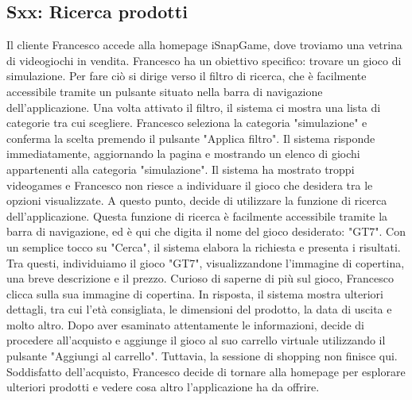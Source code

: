 \documentclass[12pt, a4paper, oneside]{book}
\begin{document}
    \subsection*{Sxx: Ricerca prodotti}

    Il cliente Francesco accede alla homepage iSnapGame, dove troviamo una vetrina di videogiochi in vendita.
    Francesco ha un obiettivo specifico: trovare un gioco di simulazione. Per fare ciò si dirige verso il filtro di
    ricerca, che è facilmente accessibile tramite un pulsante situato nella barra di navigazione dell'applicazione.
    Una volta attivato il filtro, il sistema ci mostra una lista di categorie tra cui scegliere. Francesco seleziona la
    categoria "simulazione" e conferma la scelta premendo il pulsante "Applica filtro". Il sistema risponde
    immediatamente, aggiornando la pagina e mostrando un elenco di giochi appartenenti alla categoria "simulazione".
    Il sistema ha mostrato troppi videogames e Francesco non riesce a individuare il gioco che desidera tra le opzioni
    visualizzate. A questo punto, decide di utilizzare la funzione di ricerca dell'applicazione. Questa funzione di
    ricerca è facilmente accessibile tramite la barra di navigazione, ed è qui che digita il nome del gioco
    desiderato: "GT7". Con un semplice tocco su "Cerca", il sistema elabora la richiesta e presenta i risultati.
    Tra questi, individuiamo il gioco "GT7", visualizzandone l'immagine di copertina, una breve descrizione e il prezzo.
    Curioso di saperne di più sul gioco, Francesco clicca sulla sua immagine di copertina. In risposta, il sistema
    mostra ulteriori dettagli, tra cui l'età consigliata, le dimensioni del prodotto, la data di uscita e molto altro.
    Dopo aver esaminato attentamente le informazioni, decide di procedere all'acquisto e aggiunge il gioco al suo
    carrello virtuale utilizzando il pulsante "Aggiungi al carrello". Tuttavia, la sessione di shopping non finisce qui.
    Soddisfatto dell'acquisto, Francesco decide di tornare alla homepage per esplorare ulteriori prodotti e vedere cosa
    altro l'applicazione ha da offrire.
\end{document}
